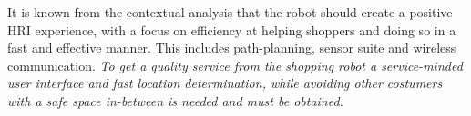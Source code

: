
It is known from the contextual analysis that the robot should create a positive HRI experience, with a focus on efficiency at helping shoppers and doing so in a fast and effective manner. This includes path-planning, sensor suite and wireless communication.
\textit{To get a quality service from the shopping robot a service-minded user interface and fast location determination, while avoiding other costumers with a safe space in-between is needed and must be obtained.}